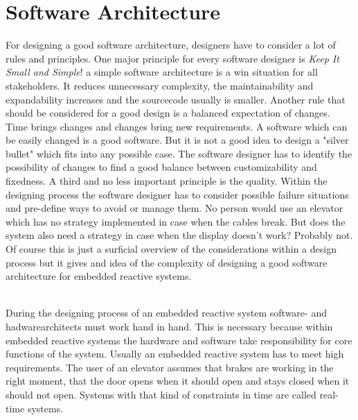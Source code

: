 {\section{Software Architecture}\label{sec:softwareArchitecture}
For designing a good software architecture, designers have to consider a lot of rules and principles. One major principle for every software designer is \textit{Keep It Small and Simple}! a simple software architecture is a win situation for all stakeholders. It reduces unnecessary complexity, the maintainability and expandability increases and the sourcecode usually is smaller. Another rule that should be considered for a good design is a balanced expectation of changes. Time brings changes and changes bring new requirements. A software which can be easily changed is a good software. But it is not a good idea to design a "silver bullet" which fits into any possible case. The software designer has to identify the possibility of changes to find a good balance between customizability and fixedness. A third and no less important principle is the quality. Within the designing process the software designer has to consider possible failure situations and pre-define ways to avoid or manage them. \cite[cf.][62 - 64]{Starke2015} No person would use an elevator which has no strategy implemented in case when the cables break. But does the system also need a strategy in case when the display doesn't work? Probably not. Of course this is just a surficial overview of the considerations within a design process but it gives and idea of the complexity of designing a good software architecture for embedded reactive systems. 

\noindent\\ During the designing process of an embedded reactive system software- and hadwarearchitects must work hand in hand. This is necessary because within embedded reactive systems the hardware and software take responsibility for core functions of the system. \cite[cf.][31 - 32]{Starke2015} Usually an embedded reactive system has to meet high requirements. The user of an elevator assumes that brakes are working in the right moment, that the door opens when it should open and stays closed when it should not open. Systems with that kind of constraints in time are called real-time systems. 

\newpage

}
